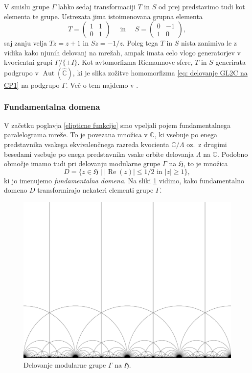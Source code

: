 \documentclass[mat1]{fmfdelo}
\numberwithin{equation}{section}
\newcommand{\C}{\mathbb C}
\newcommand{\HH}{\mathfrak{H}}
\newcommand{\RS}{\widehat{\C}}
\newcommand{\torus}{\C/\Lambda}
\newcommand{\SL}{\Gamma}
\newcommand{\abs}[1]{\left\lvert #1 \right\rvert}
\renewcommand\Re{\operatorname{Re}}%
\newcommand{\oz}{oz.\ }
\DeclareMathOperator{\Aut}{Aut}
\theoremstyle{definition}
\begin{document}
V smislu grupe $\SL$ lahko sedaj transformaciji $T$ in $S$ od prej predstavimo tudi kot elementa te grupe. Ustrezata jima istoimenovana grupna elementa
\[
    T = \begin{pmatrix}1 & 1 \\ 0 & 1\end{pmatrix} \quad \text{ in } \quad
    S = \begin{pmatrix}0 & -1 \\ 1 & 0\end{pmatrix},
\]
saj zanju velja $Tz = z + 1$ in $Sz = -1/z$. Poleg tega $T$ in $S$ nista zanimiva le z vidika kako njunih delovanj na mrežah, ampak imata celo vlogo generatorjev v kvocientni grupi $\SL/\{\pm I\}$. Kot avtomorfizma Riemannove sfere, $T$ in $S$ generirata podgrupo v $\Aut(\RS)$, ki je slika zožitve homomorfizma \eqref{eq: delovanje GL2C na CP1} na podgrupo $\SL$. Več o tem najdemo v \cite[VII, \S 1.]{Serre}.

\subsubsection*{Fundamentalna domena}

V začetku poglavja \ref{elipticne funkcije} smo vpeljali pojem fundamentalnega paralelograma mreže. To je povezana množica v $\C$, ki vsebuje po enega predstavnika vsakega ekvivalenčnega razreda kvocienta $\torus$ \oz z drugimi besedami vsebuje po enega predstavnika vsake orbite delovanja $\Lambda$ na $\C$. Podobno območje imamo tudi pri delovanju modularne grupe $\SL$ na $\HH$, to je množica 
\[
    D = \{z \in \HH \mid \abs{\Re(z)} \leq 1/2 \text{ in } \abs{z} \geq 1\},
\]
ki jo imenujemo \emph{fundamentalna domena}. Na sliki \ref{slika delovanja modularne grupe} vidimo, kako fundamentalno domeno $D$ transformirajo nekateri elementi grupe $\SL$.

\begin{figure}
    \centering
    \includegraphics[scale=0.12]{ModularTiling_3.png}
    \caption{Delovanje modularne grupe $\SL$ na $\HH$.}
    \label{slika delovanja modularne grupe}
\end{figure}
\end{document}
